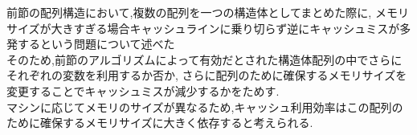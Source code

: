 前節の配列構造において,複数の配列を一つの構造体としてまとめた際に,
メモリサイズが大きすぎる場合キャッシュラインに乗り切らず逆にキャッシュミスが多発するという問題について述べた\\
そのため,前節のアルゴリズムによって有効だとされた構造体配列の中でさらにそれぞれの変数を利用するか否か,
さらに配列のために確保するメモリサイズを変更することでキャッシュミスが減少するかをためす.\\
マシンに応じてメモリのサイズが異なるため,キャッシュ利用効率はこの配列のために確保するメモリサイズに大きく依存すると考えられる.\\
